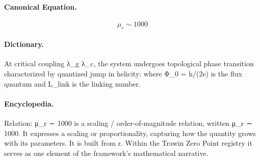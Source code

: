 \paragraph{Canonical Equation.}
\[
\mu_r \sim 1000
\]

\paragraph{Dictionary.}
At critical coupling λ\_g λ\_c, the system undergoes topological phase transition characterized by quantized jump in helicity: where Φ\_0 = h/(2e) is the flux quantum and L\_link is the linking number.

\paragraph{Encyclopedia.}
Relation: μ\_r ∼ 1000 is a scaling / order-of-magnitude relation, written μ\_r ∼ 1000. It expresses a scaling or proportionality, capturing how the quantity grows with its parameters. It is built from r. Within the Trawin Zero Point registry it serves as one element of the framework's mathematical narrative.

